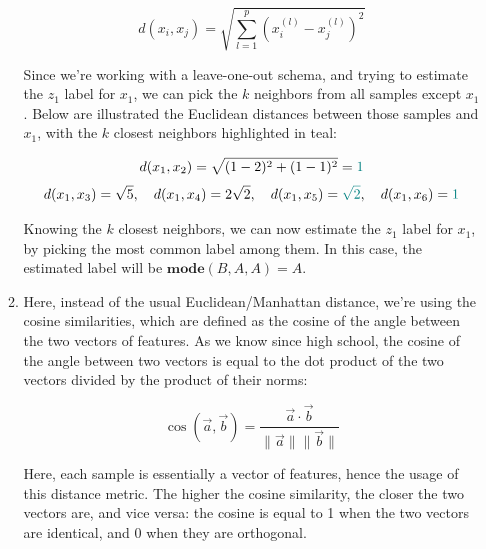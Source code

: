 \documentclass[12pt]{article}
\begin{document}
\begin{enumerate}[leftmargin=\labelsep]
\begin{enumerate}
{                \begin{equation*}
                  d(x_i, x_j) = \sqrt{\sum_{l=1}^p (x_{i}^{(l)} - x_{j}^{(l)})^2}
                \end{equation*}

                Since we're working with a leave-one-out schema, and trying to estimate
                the $z_1$ label for $x_1$, we can pick the $k$ neighbors from all
                samples except $x_1$. Below are illustrated the Euclidean distances
                between those samples and $x_1$, with the $k$ closest neighbors highlighted
                in teal:

                \begin{align*}
                  d(x_1, x_2) = \sqrt{(1 - 2)^2 + (1 - 1)^2} = \textcolor{teal}{1}
                \end{align*}
                \begin{align*}
                  d(x_1, x_3) = \sqrt{5}  , \quad
                  d(x_1, x_4) = 2 \sqrt{2}, \quad
                  d(x_1, x_5) = \textcolor{teal}{\sqrt{2}}  , \quad
                  d(x_1, x_6) = \textcolor{teal}{1}
                \end{align*}

                Knowing the $k$ closest neighbors, we can now estimate the $z_1$ label
                for $x_1$, by picking the most common label among them. In this case,
                the estimated label will be $\mathbf{mode} (B, A, A) = A$.
                }
          \item {
                Here, instead of the usual Euclidean/Manhattan distance, we're using the
                cosine similarities, which are defined as the cosine of the angle between
                the two vectors of features. As we know since high school, the cosine of
                the angle between two vectors is equal to the dot product of the two
                vectors divided by the product of their norms:

                \begin{equation*}
                  \cos(\vec{a}, \vec{b}) = \frac{\vec{a} \cdot \vec{b}}{\|\vec{a}\| \|\vec{b}\|}
                \end{equation*}

                Here, each sample is essentially a vector of features, hence the usage
                of this distance metric. The higher the cosine similarity, the closer
                the two vectors are, and vice versa: the cosine is equal to 1 when the
                two vectors are identical, and 0 when they are orthogonal.

}
\end{enumerate}
\end{enumerate}
\end{document}
